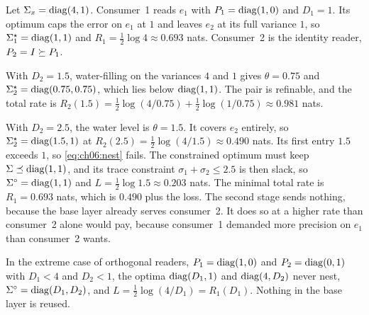 \begin{example}\label{ex:ch06:two}
Let $\Sigma_x=\operatorname{diag}(4,1)$. Consumer~1 reads $e_1$ with $P_1=\operatorname{diag}(1,0)$ and $D_1=1$. Its optimum caps the error on $e_1$ at $1$ and leaves $e_2$ at its full variance $1$, so $\Sigma_1^\star=\operatorname{diag}(1,1)$ and $R_1=\tfrac12\log4\approx0.693$ nats. Consumer~2 is the identity reader, $P_2=I\succeq P_1$.

With $D_2=1.5$, water-filling on the variances $4$ and $1$ gives $\theta=0.75$ and $\Sigma_2^\star=\operatorname{diag}(0.75,0.75)$, which lies below $\operatorname{diag}(1,1)$. The pair is refinable, and the total rate is $R_2(1.5)=\tfrac12\log(4/0.75)+\tfrac12\log(1/0.75)\approx0.981$ nats.

With $D_2=2.5$, the water level is $\theta=1.5$. It covers $e_2$ entirely, so $\Sigma_2^\star=\operatorname{diag}(1.5,1)$ at $R_2(2.5)=\tfrac12\log(4/1.5)\approx0.490$ nats. Its first entry $1.5$ exceeds $1$, so \cref{eq:ch06:nest} fails. The constrained optimum must keep $\Sigma\preceq\operatorname{diag}(1,1)$, and its trace constraint $\sigma_1+\sigma_2\le2.5$ is then slack, so $\Sigma^\circ=\operatorname{diag}(1,1)$ and $L=\tfrac12\log1.5\approx0.203$ nats. The minimal total rate is $R_1=0.693$ nats, which is $0.490$ plus the loss. The second stage sends nothing, because the base layer already serves consumer~2. It does so at a higher rate than consumer~2 alone would pay, because consumer~1 demanded more precision on $e_1$ than consumer~2 wants.

In the extreme case of orthogonal readers, $P_1=\operatorname{diag}(1,0)$ and $P_2=\operatorname{diag}(0,1)$ with $D_1<4$ and $D_2<1$, the optima $\operatorname{diag}(D_1,1)$ and $\operatorname{diag}(4,D_2)$ never nest, $\Sigma^\circ=\operatorname{diag}(D_1,D_2)$, and $L=\tfrac12\log(4/D_1)=R_1(D_1)$. Nothing in the base layer is reused.
\end{example}

